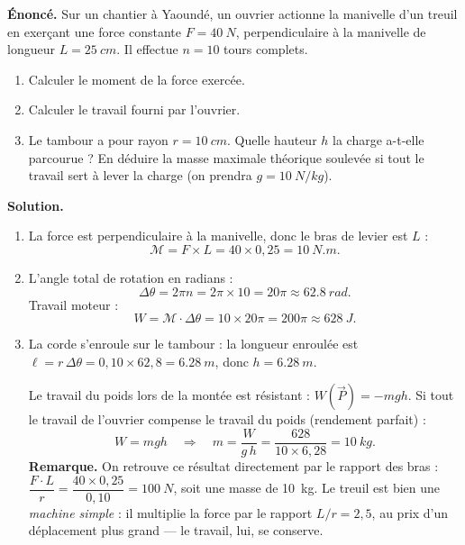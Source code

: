 \documentclass[11pt]{article}
\begin{document}
\begin{exoresolu}
\textbf{Énoncé.} Sur un chantier à Yaoundé, un ouvrier actionne la manivelle d'un treuil en exerçant une force constante $F = \SI{40}{N}$, perpendiculaire à la manivelle de longueur $L = \SI{25}{cm}$. Il effectue $n = 10$ tours complets.
\begin{enumerate}
\item Calculer le moment de la force exercée.
\item Calculer le travail fourni par l'ouvrier.
\item Le tambour a pour rayon $r = \SI{10}{cm}$. Quelle hauteur $h$ la charge a-t-elle parcourue ? En déduire la masse maximale théorique soulevée si tout le travail sert à lever la charge (on prendra $g = \SI{10}{N/kg}$).
\end{enumerate}
\tcblower
\textbf{Solution.}
\begin{enumerate}
\item La force est perpendiculaire à la manivelle, donc le bras de levier est $L$ :
\[
\mathcal{M} = F \times L = 40 \times 0,25 = \SI{10}{N.m}.
\]
\item L'angle total de rotation en radians :
\[
\Delta\theta = 2\pi n = 2\pi \times 10 = 20\pi \approx \SI{62,8}{rad}.
\]
Travail moteur :
\[
W = \mathcal{M} \cdot \Delta\theta = 10 \times 20\pi = 200\pi \approx \SI{628}{J}.
\]
\item La corde s'enroule sur le tambour : la longueur enroulée est $\ell = r\,\Delta\theta = 0,10 \times 62,8 = \SI{6,28}{m}$, donc $h = \SI{6,28}{m}$.

Le travail du poids lors de la montée est résistant : $W(\vec{P}) = -mgh$. Si tout le travail de l'ouvrier compense le travail du poids (rendement parfait) :
\[
W = mgh \quad \Longrightarrow \quad m = \dfrac{W}{g\,h} = \dfrac{628}{10 \times 6,28} = \SI{10}{kg}.
\]
\textbf{Remarque.} On retrouve ce résultat directement par le rapport des bras : $\dfrac{F \cdot L}{r} = \dfrac{40 \times 0,25}{0,10} = \SI{100}{N}$, soit une masse de \SI{10}{kg}. Le treuil est bien une \emph{machine simple} : il multiplie la force par le rapport $L/r = 2,5$, au prix d'un déplacement plus grand — le travail, lui, se conserve.
\end{enumerate}
\end{exoresolu}
\end{document}
